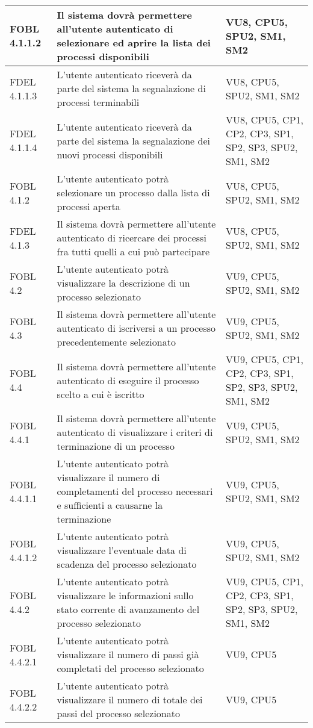 \begin{longtable}{lXp{}}
\midrule
FOBL 4.1.1.2&Il sistema dovrà permettere all'utente autenticato di selezionare ed aprire la lista dei processi disponibili&VU8, CPU5, SPU2, SM1, SM2\\
\midrule
FDEL 4.1.1.3&L'utente autenticato riceverà da parte del sistema la segnalazione di processi terminabili&VU8, CPU5, SPU2, SM1, SM2\\
\midrule
FDEL 4.1.1.4&L'utente autenticato riceverà da parte del sistema la segnalazione dei nuovi processi disponibili&VU8, CPU5, CP1, CP2, CP3, SP1, SP2, SP3, SPU2, SM1, SM2\\
\midrule
FOBL 4.1.2&L'utente autenticato potrà selezionare un processo dalla lista di processi aperta&VU8, CPU5, SPU2, SM1, SM2\\
\midrule
FDEL 4.1.3&Il sistema dovrà permettere all'utente autenticato di ricercare dei processi fra tutti quelli a cui può partecipare&VU8, CPU5, SPU2, SM1, SM2\\
\midrule
FOBL 4.2&L'utente autenticato potrà visualizzare la descrizione di un processo selezionato&VU9, CPU5, SPU2, SM1, SM2\\
\midrule
FOBL 4.3&Il sistema dovrà permettere all'utente autenticato di iscriversi a un processo precedentemente selezionato&VU9, CPU5, SPU2, SM1, SM2\\
\midrule
FOBL 4.4&Il sistema dovrà permettere all'utente autenticato di eseguire il processo scelto a cui è iscritto&VU9, CPU5, CP1, CP2, CP3, SP1, SP2, SP3, SPU2, SM1, SM2\\
\midrule
FOBL 4.4.1&Il sistema dovrà permettere all'utente autenticato di visualizzare i criteri di terminazione di un processo&VU9, CPU5, SPU2, SM1, SM2\\
\midrule
FOBL 4.4.1.1&L'utente autenticato potrà visualizzare il numero di completamenti del processo necessari e sufficienti a causarne la terminazione&VU9, CPU5, SPU2, SM1, SM2\\
\midrule
FOBL 4.4.1.2&L'utente autenticato potrà visualizzare l'eventuale data di scadenza del processo selezionato&VU9, CPU5, SPU2, SM1, SM2\\
\midrule
FOBL 4.4.2&L'utente autenticato potrà visualizzare le informazioni sullo stato corrente di avanzamento del processo selezionato&VU9, CPU5, CP1, CP2, CP3, SP1, SP2, SP3, SPU2, SM1, SM2\\
\midrule
FOBL 4.4.2.1&L'utente autenticato potrà visualizzare il numero di passi già completati del processo selezionato&VU9, CPU5\\
\midrule
FOBL 4.4.2.2&L'utente autenticato potrà visualizzare il numero di totale dei passi del processo selezionato&VU9, CPU5\\

\end{longtable}
